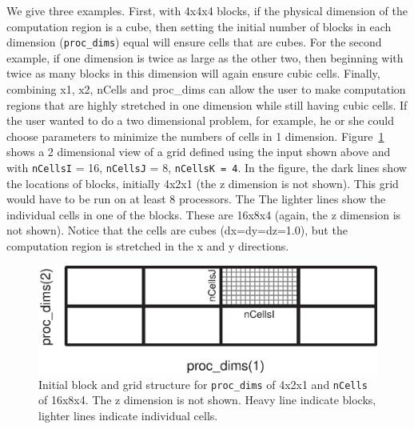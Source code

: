 We give three examples.
First, with 4x4x4 blocks, if the physical dimension
of the computation region is a cube, then setting the initial number of blocks
in each dimension ({\tt proc\_dims}) equal will ensure cells that are cubes.  
For the second example, if one dimension is twice
as large as the other two, then beginning with twice as many blocks in this dimension
will again ensure cubic cells.  
Finally, combining x1, x2, nCells and proc\_dims can allow the user to make computation
regions that are highly stretched in  one dimension while still having
cubic cells.  If the user wanted to do a two dimensional problem, for example,
he or she could choose parameters to minimize the numbers of cells in 1 dimension.
Figure~\ref{fig:stretched_initial_grid} shows a 2 dimensional view of a 
grid defined using the input shown above and 
with {\tt nCellsI} = 16, {\tt nCellsJ} = 8, {\tt  nCellsK = 4}.
In the figure, the dark lines show the locations of blocks, initially
4x2x1 (the z dimension is not shown).  This grid would have to be 
run on at least 8 processors.  The
The lighter lines show the individual cells in one of the blocks.  These are 16x8x4 
(again, the z dimension is not shown).  Notice that the cells are cubes (dx=dy=dz=1.0),
but the computation region is stretched in the x and y directions.
\begin{figure}
\begin{center}
\includegraphics*[width=6.0in]{proc_dims.eps}
\end{center}
\caption{Initial block and grid structure for {\tt proc\_dims} of 4x2x1
and {\tt nCells} of 16x8x4.  The z dimension is not shown.  Heavy line indicate
blocks, lighter lines indicate individual cells.
\label{fig:stretched_initial_grid}
}
\end{figure}


